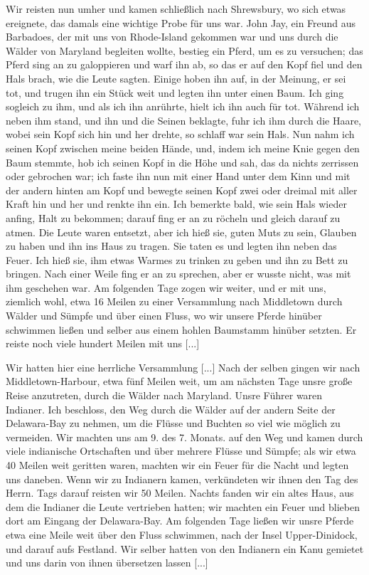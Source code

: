 Wir reisten nun umher und kamen schließlich nach Shrewsbury,
wo sich etwas ereignete, das damals eine wichtige Probe für uns
war. John Jay, ein Freund aus Barbadoes, der mit uns von
Rhode-Island gekommen war und uns durch die Wälder von
Maryland begleiten wollte, bestieg ein Pferd, um es zu versuchen;
das Pferd sing an zu galoppieren und warf ihn ab, so das er
auf den Kopf fiel und den Hals brach, wie die Leute sagten.
Einige hoben ihn auf, in der Meinung, er sei tot, und trugen
ihn ein Stück weit und legten ihn unter einen Baum. Ich ging
sogleich zu ihm, und als ich ihn anrührte, hielt ich ihn auch für
tot. Während ich neben ihm stand, und ihn und die Seinen
beklagte, fuhr ich ihm durch die Haare, wobei sein Kopf sich hin
und her drehte, so schlaff war sein Hals. Nun nahm ich seinen
Kopf zwischen meine beiden Hände, und, indem ich meine Knie
gegen den Baum stemmte, hob ich seinen Kopf in die Höhe und
sah, das da nichts zerrissen oder gebrochen war; ich faste ihn
nun mit einer Hand unter dem Kinn und mit der andern hinten
am Kopf und bewegte seinen Kopf zwei oder dreimal mit aller
Kraft hin und her und renkte ihn ein. Ich bemerkte bald, wie
sein Hals wieder anfing, Halt zu bekommen; darauf fing er an
zu röcheln und gleich darauf zu atmen. Die Leute waren entsetzt, 
aber ich hieß sie, guten Muts zu sein, Glauben zu haben
und ihn ins Haus zu tragen. Sie taten es und legten ihn neben
das Feuer. Ich hieß sie, ihm etwas Warmes zu trinken zu geben
und ihn zu Bett zu bringen. Nach einer Weile fing er an zu sprechen,
aber er wusste nicht, was mit ihm geschehen war. Am folgenden
Tage zogen wir weiter, und er mit uns, ziemlich wohl, etwa
16 Meilen zu einer Versammlung nach Middletown durch Wälder
und Sümpfe und über einen Fluss, wo wir unsere Pferde hinüber
schwimmen ließen und selber aus einem hohlen Baumstamm hinüber
setzten. Er reiste noch viele hundert Meilen mit uns [...]

Wir hatten hier eine herrliche Versammlung [...] Nach der
selben gingen wir nach Middletown-Harbour, etwa fünf Meilen weit,
um am nächsten Tage unsre große Reise anzutreten, durch die
Wälder nach Maryland. Unsre Führer waren Indianer. Ich
beschloss, den Weg durch die Wälder auf der andern Seite der
Delawara-Bay zu nehmen, um die Flüsse und Buchten so viel wie
möglich zu vermeiden. Wir machten uns am 9. des 7. Monats.
auf den Weg und kamen durch viele indianische Ortschaften und über
mehrere Flüsse und Sümpfe; als wir etwa 40 Meilen weit
geritten waren, machten wir ein Feuer für die Nacht und legten
uns daneben. Wenn wir zu Indianern kamen, verkündeten
wir ihnen den Tag des Herrn. Tags darauf reisten wir 50 Meilen.
Nachts fanden wir ein altes Haus, aus dem die Indianer die
Leute vertrieben hatten; wir machten ein Feuer und blieben dort
am Eingang der Delawara-Bay. Am folgenden Tage ließen wir
unsre Pferde etwa eine Meile weit über den Fluss schwimmen,
nach der Insel Upper-Dinidock, und darauf aufs Festland. Wir
selber hatten von den Indianern ein Kanu gemietet und uns
darin von ihnen übersetzen lassen [...]

